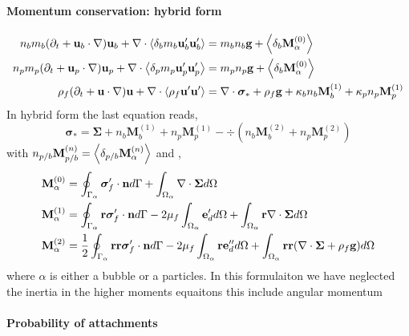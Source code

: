 \paragraph*{Momentum conservation: hybrid form}
\begin{align}
    n_b m_b (\pddt + \textbf{u}_b\cdot  \grad) \textbf{u}_b
    + \div \pavg[b]{ m_b \textbf{u}_b' \textbf{u}_b'}
    &= 
    m_b n_b \textbf{g}
    + \pavg[b]{\textbf{M}^{(0)}_\alpha}
    \\
    n_p m_p (\pddt + \textbf{u}_p\cdot  \grad) \textbf{u}_p
    + \div \pavg{ m_p \textbf{u}_p' \textbf{u}_p'}
    &= 
    m_p n_p \textbf{g}
    + \pavg[b]{\textbf{M}^{(0)}_\alpha}
    \\
    \rho_f (\pddt + \textbf{u} \cdot \grad)\textbf{u}
    + \div \avg{\rho_f \textbf{u}' \textbf{u}'}
    &= 
    \div \bm\sigma_*
    + \rho_f \textbf{g}
    +\kappa_b   n_b \textbf{M}_b^{(1)}
    +\kappa_p   n_p \textbf{M}_p^{(1)}
\end{align}
In hybrid form the last equation reads, 
\begin{equation}
    \bm\sigma_* 
    =
    \bm\Sigma
    +  n_b \textbf{M}_b^{(1)}
    +  n_p \textbf{M}_p^{(1)}
    -\div (  n_b \textbf{M}_b^{(2)}
    +  n_p \textbf{M}_p^{(2)})
\end{equation}
with $n_{p/b} \textbf{M}_{p/b}^{(n)} = \pavg[p/b]{\textbf{M}_\alpha^{(n)}}$ and , 
\begin{align}
    \textbf{M}_\alpha^{(0)} &=
    \intS{\bm{\sigma}_f' \cdot \textbf{n}}
   +\intO{\div \bm\Sigma}
   \\
   \textbf{M}_\alpha^{(1)} &=
   \intS{\textbf{r}\bm{\sigma}_f' \cdot \textbf{n}}
   -2\mu_f \intO{\textbf{e}_d'}
   +\intO{\textbf{r}\div \bm\Sigma}
   \\
   \textbf{M}_\alpha^{(2)} &=
   \frac{1}{2}\intS{\textbf{rr}\bm{\sigma}_f' \cdot \textbf{n}}
   -2\mu_f \intO{\textbf{re}_d''}
   +\intO{\textbf{rr}(\div \bm\Sigma+ \rho_f\textbf{g})}
    \\
\end{align}
where $\alpha$ is either a bubble or a particles. 
In this formulaiton we have neglected the inertia in the higher moments equaitons this include angular momentum 

\paragraph*{Probability of attachments }


